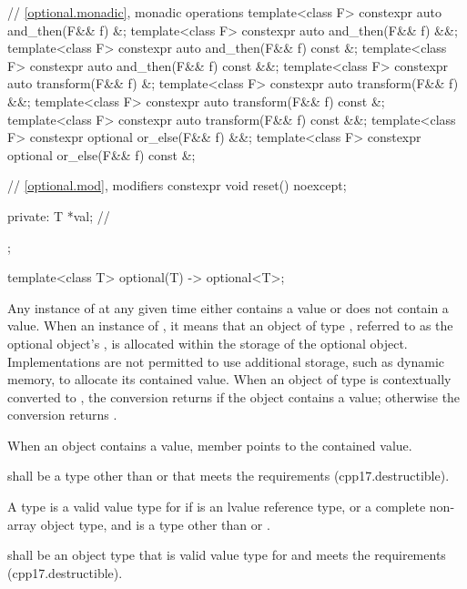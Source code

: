 \begin{codeblock}
{{    // \ref{optional.monadic}, monadic operations
    template<class F> constexpr auto and_then(F&& f) &;
    template<class F> constexpr auto and_then(F&& f) &&;
    template<class F> constexpr auto and_then(F&& f) const &;
    template<class F> constexpr auto and_then(F&& f) const &&;
    template<class F> constexpr auto transform(F&& f) &;
    template<class F> constexpr auto transform(F&& f) &&;
    template<class F> constexpr auto transform(F&& f) const &;
    template<class F> constexpr auto transform(F&& f) const &&;
    template<class F> constexpr optional or_else(F&& f) &&;
    template<class F> constexpr optional or_else(F&& f) const &;

    // \ref{optional.mod}, modifiers
    constexpr void reset() noexcept;

  private:
    T *val;         // \expos
  };

  template<class T>
    optional(T) -> optional<T>;
}
\end{codeblock}

\pnum
Any instance of  at any given time either contains a value or does not contain a value.
When an instance of  ,
it means that an object of type , referred to as the optional object's ,
is allocated within the storage of the optional object.
Implementations are not permitted to use additional storage, such as dynamic memory, to allocate its contained value.
When an object of type  is contextually converted to ,
the conversion returns  if the object contains a value;
otherwise the conversion returns .

\pnum
When an  object contains a value,
member  points to the contained value.

\begin{removedblock}
 shall be a  type
other than \cv{}  or \cv{} 
that meets the  requirements (cpp17.destructible).
\end{removedblock}

\begin{addedblock}
\pnum
A type  is a valid value type for  if  is an lvalue reference type,
or a complete non-array object type, and  is a type other than \cv{}  or \cv{} .

\pnum
{} shall be an object type that is valid value type for  and meets the  requirements (cpp17.destructible).
\end{addedblock}

